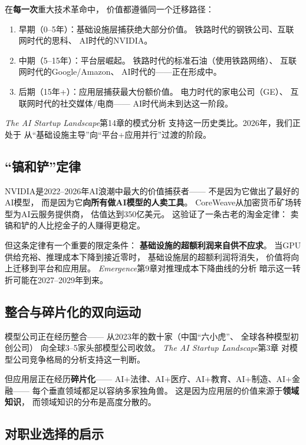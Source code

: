 \begin{keybox}
在\textbf{每一次}重大技术革命中，
价值都遵循同一个迁移路径：
\begin{enumerate}
  \item 早期（0--5年）：基础设施层捕获绝大部分价值。
    铁路时代的钢铁公司、互联网时代的思科、
    AI时代的NVIDIA。
  \item 中期（5--15年）：平台层崛起。
    铁路时代的标准石油（使用铁路网络）、
    互联网时代的Google/Amazon、
    AI时代的——正在形成中。
  \item 后期（15年+）：应用层捕获最大份额价值。
    电力时代的家电公司（GE）、
    互联网时代的社交媒体/电商——
    AI时代尚未到达这一阶段。
\end{enumerate}
\textit{The AI Startup Landscape}第14章的模式分析
支持这一历史类比。2026年，我们正处于
从``基础设施主导''向``平台+应用并行''过渡的阶段。
\end{keybox}

\subsection{``镐和铲''定律}

NVIDIA是2022--2026年AI浪潮中最大的价值捕获者——
不是因为它做出了最好的AI模型，
而是因为它\textbf{向所有做AI模型的人卖工具}。
CoreWeave从加密货币矿场转型为AI云服务提供商，
估值达到350亿美元。
这验证了一条古老的淘金定律：
卖镐和铲的人比挖金子的人赚得更稳定。

但这条定律有一个重要的限定条件：
\textbf{基础设施的超额利润来自供不应求}。
当GPU供给充裕、推理成本下降到接近零时，
基础设施层的超额利润将消失，
价值将向上迁移到平台和应用层。
\textit{Emergence}第9章对推理成本下降曲线的分析
暗示这一转折可能在2027--2029年到来。

\subsection{整合与碎片化的双向运动}

模型公司正在经历整合——
从2023年的数十家（中国``六小虎''、
全球各种模型初创公司）
向全球3--5家头部模型公司收敛。
\textit{The AI Startup Landscape}第3章
对模型公司竞争格局的分析支持这一判断。

但应用层正在经历\textbf{碎片化}——
AI+法律、AI+医疗、AI+教育、AI+制造、AI+金融——
每个垂直领域都足以容纳多家独角兽。
这是因为应用层的价值来源于\textbf{领域知识}，
而领域知识的分布是高度分散的。

\subsection{对职业选择的启示}

